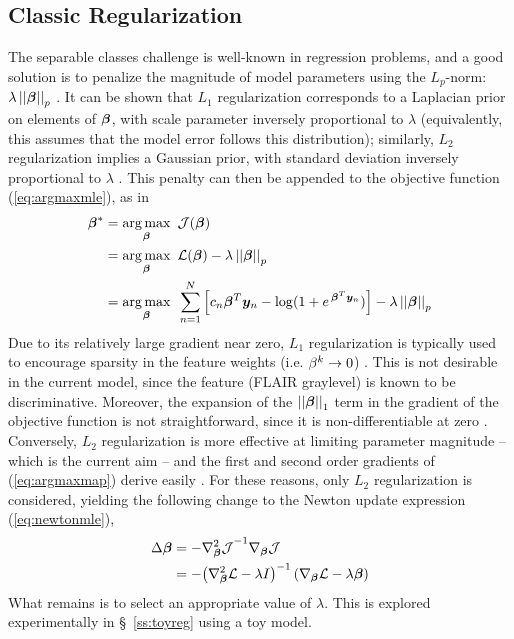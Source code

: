\subsection{Classic Regularization}
The separable classes challenge is well-known in regression problems, and a good solution is to penalize the magnitude of model parameters using the $L_p$-norm: $\lambda\left|\left|\bm{\beta}\right|\right|_p$ \cite{Zou2005}. It can be shown that $L_1$ regularization corresponds to a Laplacian prior on elements of $\bm{\beta}$, with scale parameter inversely proportional to $\lambda$ (equivalently, this assumes that the model error follows this distribution); similarly, $L_2$ regularization implies a Gaussian prior, with standard deviation inversely proportional to $\lambda$ \cite{Zou2005}. This penalty can then be appended to the objective function (\ref{eq:argmaxmle}), as in 
\begin{align}
\bm{\beta}^* &= \underset{\bm{\beta}}{\arg\max}\enspace\mathcal{J}(\bm{\beta}) \nonumber\\
&=\underset{\bm{\beta}}{\arg\max}\enspace\mathcal{L}(\bm{\beta}) - \lambda\left|\left|\bm{\beta}\right|\right|_p \nonumber\\
&= \underset{\bm{\beta}}{\arg\max}\enspace\sum_{n=1}^{N} \Big[ c_n \bm{\beta}^T\bm{y}_n - \log (1+e^{\thinspace\bm{\beta}^T\bm{y}_n}) \Big] - \lambda\left|\left|\bm{\beta}\right|\right|_p
\label{eq:argmaxmap}
\end{align}
Due to its relatively large gradient near zero, $L_1$ regularization is typically used to encourage sparsity in the feature weights (i.e. $\beta^k\rightarrow0$) \cite{Tibshirani1996}. This is not desirable in the current model, since the feature (FLAIR graylevel) is known to be discriminative. Moreover, the expansion of the $\left|\left|\bm{\beta}\right|\right|_1$ term in the gradient of the objective function is not straightforward, since it is non-differentiable at zero \cite{Tibshirani1996,Lee2006}. Conversely, $L_2$ regularization is more effective at limiting parameter magnitude -- which is the current aim -- and the first and second order gradients of (\ref{eq:argmaxmap}) derive easily \cite{Minka2003}. For these reasons, only $L_2$ regularization is considered, yielding the following change to the Newton update expression (\ref{eq:newtonmle}),
\begin{align}
\Delta\bm{\beta} &= -{\nabla^2_{\bm{\beta}}\mathcal{J}}^{-1}\nabla_{\bm{\beta}}\mathcal{J} \nonumber\\
&= -{\left(\nabla^2_{\bm{\beta}}\mathcal{L}-\lambda I\right)}^{-1}\left(\nabla_{\bm{\beta}}\mathcal{L}-\lambda\bm{\beta}\right)
\label{eq:newtonmap}
\end{align}
What remains is to select an appropriate value of $\lambda$. This is explored experimentally in \S\ \ref{ss:toyreg} using a toy model.
